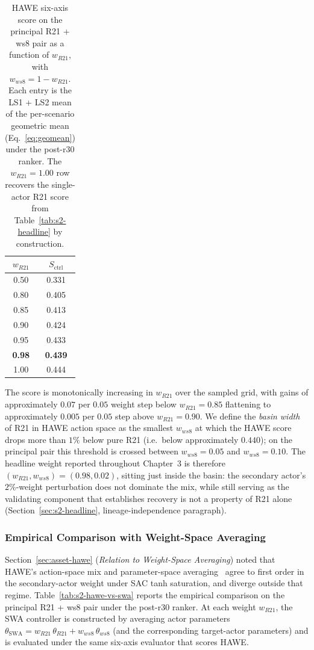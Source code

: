 \documentclass{unnc-fyp}
\begin{document}
\begin{table}[tb]
  \centering
  \small
  \caption{HAWE six-axis score on the principal R21 + ws8 pair as
           a function of $w_{R21}$, with $w_{ws8} = 1 - w_{R21}$.
           Each entry is the LS1 + LS2 mean of the per-scenario
           geometric mean (Eq.~\eqref{eq:geomean}) under the
           post-r30 ranker. The $w_{R21} = 1.00$ row recovers the
           single-actor R21 score from
           Table~\ref{tab:s2-headline} by construction.}
  \label{tab:s2-hawe-sweep}
  \begin{tabular}{@{}cc@{}}
    \toprule
    $w_{R21}$ & $S_\mathrm{ctrl}$ \\
    \midrule
    0.50 & 0.331 \\
    0.80 & 0.405 \\
    0.85 & 0.413 \\
    0.90 & 0.424 \\
    0.95 & 0.433 \\
    \textbf{0.98} & \textbf{0.439} \\
    1.00 & 0.444 \\
    \bottomrule
  \end{tabular}
\end{table}

The score is monotonically increasing in $w_{R21}$ over the
sampled grid, with gains of approximately $0.07$ per $0.05$
weight step below $w_{R21} = 0.85$ flattening to approximately
$0.005$ per $0.05$ step above $w_{R21} = 0.90$.
We define the \emph{basin width} of R21 in HAWE action space as
the smallest $w_{ws8}$ at which the HAWE score drops more than
$1\%$ below pure R21 (i.e.\ below approximately $0.440$); on the
principal pair this threshold is crossed between $w_{ws8} = 0.05$
and $w_{ws8} = 0.10$.
The headline weight reported throughout Chapter~3 is therefore
$(w_{R21}, w_{ws8}) = (0.98, 0.02)$, sitting just inside the
basin: the secondary actor's $2\%$-weight perturbation does not
dominate the mix, while still serving as the validating component
that establishes recovery is not a property of R21 alone
(Section~\ref{sec:s2-headline}, lineage-independence paragraph).

\subsubsection{Empirical Comparison with Weight-Space Averaging}
\label{sec:s2-hawe-vs-swa}

Section~\ref{sec:asset-hawe} (\emph{Relation to Weight-Space
Averaging}) noted that HAWE's action-space mix and parameter-space
averaging~\cite{izmailov2018swa} agree to first order in the
secondary-actor weight under SAC tanh saturation, and diverge
outside that regime.
Table~\ref{tab:s2-hawe-vs-swa} reports the empirical comparison on
the principal R21 + ws8 pair under the post-r30 ranker.
At each weight $w_{R21}$, the SWA controller is constructed by
averaging actor parameters
$\theta_{\mathrm{SWA}} = w_{R21}\,\theta_{R21} + w_{ws8}\,\theta_{ws8}$
(and the corresponding target-actor parameters) and is evaluated
under the same six-axis evaluator that scores HAWE.
\end{document}
